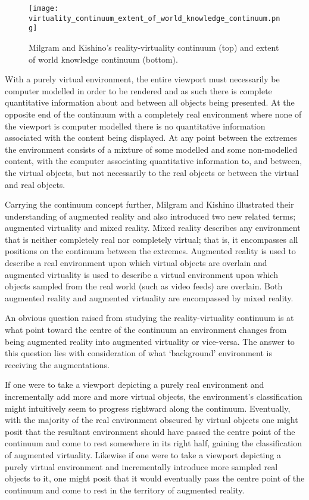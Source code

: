 \begin{figure}[h]
\centering
\texttt{[image: virtuality\_continuum\_extent\_of\_world\_knowledge\_continuum.png]}
\caption{Milgram and Kishino's reality-virtuality continuum (top) and extent of world knowledge continuum (bottom).}
\label{reality_virtuality_extent_of_world_knowledge_continuum}
\end{figure}

With a purely virtual environment, the entire viewport must necessarily be computer modelled in order to be rendered and as such there is complete quantitative information about and between all objects being presented. At the opposite end of the continuum with a completely real environment where none of the viewport is computer modelled there is no quantitative information associated with the content being displayed. At any point between the extremes the environment consists of a mixture of some modelled and some non-modelled content, with the computer associating quantitative information to, and between, the virtual objects, but not necessarily to the real objects or between the virtual and real objects.

Carrying the continuum concept further, Milgram and Kishino illustrated their understanding of augmented reality and also introduced two new related terms; augmented virtuality and mixed reality. Mixed reality describes any environment that is neither completely real nor completely virtual; that is, it encompasses all positions on the continuum between the extremes. Augmented reality is used to describe a real environment upon which virtual objects are overlain and augmented virtuality is used to describe a virtual environment upon which objects sampled from the real world (such as video feeds) are overlain. Both augmented reality and augmented virtuality are encompassed by mixed reality.

An obvious question raised from studying the reality-virtuality continuum is at what point toward the centre of the continuum an environment changes from being augmented reality into augmented virtuality or vice-versa. The answer to this question lies with consideration of what `background' environment is receiving the augmentations.

If one were to take a viewport depicting a purely real environment and incrementally add more and more virtual objects, the environment's classification might intuitively seem to progress rightward along the continuum. Eventually, with the majority of the real environment obscured by virtual objects one might posit that the resultant environment should have passed the centre point of the continuum and come to rest somewhere in its right half, gaining the classification of augmented virtuality. Likewise if one were to take a viewport depicting a purely virtual environment and incrementally introduce more sampled real objects to it, one might posit that it would eventually pass the centre point of the continuum and come to rest in the territory of augmented reality.


